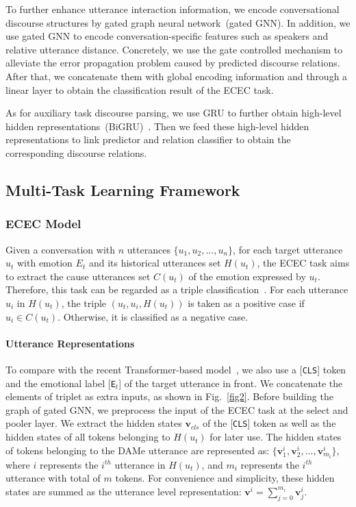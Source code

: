 \documentclass[11pt]{article}
\begin{document}
To further enhance utterance interaction information, we encode conversational discourse structures by gated graph neural network~(gated GNN).
In addition, we use gated GNN to encode conversation-specific features such as speakers and relative utterance distance.
Concretely, we use the gate controlled mechanism to alleviate the error propagation problem caused by predicted discourse relations.
After that, we concatenate them with global encoding information and through a linear layer to obtain the classification result of the ECEC task.

As for auxiliary task discourse parsing, 
we use GRU to further obtain high-level hidden representations~(BiGRU)~\cite{cho2014learning}. 
Then we feed these high-level hidden representations to link predictor and relation classifier to obtain the corresponding discourse relations.

\subsection{Multi-Task Learning Framework}

\subsubsection{ECEC Model}
Given a conversation with $n$ utterances $\{u_1, u_2,..., u_n\}$, 
for each target utterance $u_t$ with emotion $E_t$ and its historical utterances set $H(u_t)$, 
the ECEC task aims to extract the cause utterances set $C(u_t)$ of the emotion expressed by $u_t$.
Therefore, this task can be regarded as a triple classification~\cite{poria2021recognizing}.
For each utterance $u_i$ in $H(u_t)$, the triple $(u_t, u_i, H(u_t))$ is taken as a positive case if $u_i \in C(u_t)$.
Otherwise, it is classified as a negative case.

\paragraph{Utterance Representations}
To compare with the recent Transformer-based model~\cite{poria2021recognizing}, we also use a [\texttt{CLS}] token and the emotional label [\texttt{E$_t$}] of the target utterance in front.
We concatenate the elements of triplet as extra inputs, as shown in Fig.~\ref{fig2}. 
Before building the graph of gated GNN, we preprocess the input of the ECEC task at the select and pooler layer.
We extract the hidden states $\mathbf{v}_{cls}$ of the [\texttt{CLS}] token as well as the hidden states of all tokens belonging to $H(u_t)$ for later use. 
The hidden states of tokens belonging to the DAMe utterance are represented as: $\{\mathbf{v}^{i}_{1},\mathbf{v}^{i}_{2},...,\mathbf{v}^{i}_{m_i}\}$,
where $i$ represents the $i^{th}$ utterance in $H(u_t)$, and $m_i$ represents the $i^{th}$ utterance with total of $m$ tokens.
For convenience and simplicity, these hidden states are summed as the utterance level representation: $\mathbf{v}^i=\sum\limits_{j=0}^{m_i} \mathbf{v}^{i}_{j}$.
\end{document}
